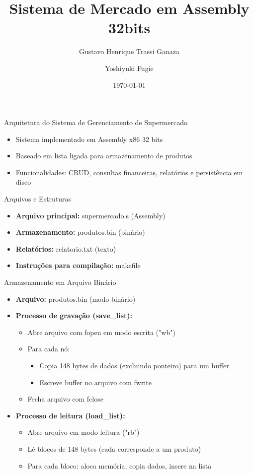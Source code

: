 \documentclass{beamer}
\title{Sistema de Mercado em Assembly 32bits}
\author{Gustavo Henrique Trassi Ganaza \and Yoshiyuki Fugie}
\date{\today}
\begin{document}
\begin{frame}
    \titlepage
\end{frame}

\begin{frame}{Arquitetura do Sistema de Gerenciamento de Supermercado}
    \begin{itemize}
        \item Sistema implementado em Assembly x86 32 bits
        \item Baseado em lista ligada para armazenamento de produtos
        \item Funcionalidades: CRUD, consultas financeiras, relatórios e persistência em disco
    \end{itemize}
\end{frame}

\begin{frame}{Arquivos e Estruturas}
    \begin{itemize}
        \item \textbf{Arquivo principal:} supermercado.s (Assembly)
        \item \textbf{Armazenamento:} produtos.bin (binário)
        \item \textbf{Relatórios:} relatorio.txt (texto)
        \item \textbf{Instruções para compilação:} makefile
    \end{itemize}
    
\end{frame}

\begin{frame}{Armazenamento em Arquivo Binário}
    \begin{itemize}
        \item \textbf{Arquivo:} produtos.bin (modo binário)
        \item \textbf{Processo de gravação (save\_list):}
        \begin{itemize}
            \item Abre arquivo com fopen em modo escrita ("wb")
            \item Para cada nó:
            \begin{itemize}
                \item Copia 148 bytes de dados (excluindo ponteiro) para um buffer
                \item Escreve buffer no arquivo com fwrite
            \end{itemize}
            \item Fecha arquivo com fclose
        \end{itemize}
        \item \textbf{Processo de leitura (load\_list):}
        \begin{itemize}
            \item Abre arquivo em modo leitura ("rb")
            \item Lê blocos de 148 bytes (cada corresponde a um produto)
            \item Para cada bloco: aloca memória, copia dados, insere na lista
        \end{itemize}
    \end{itemize}
\end{frame}
\end{document}
